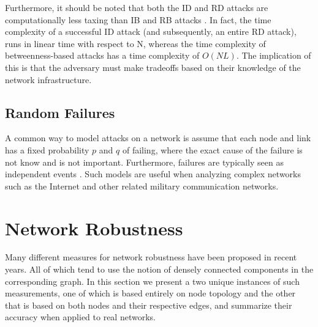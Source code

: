 \documentclass[11pt]{article}
\begin{document}
Furthermore, it should be noted that both the ID and RD attacks are computationally less taxing than IB and RB attacks \cite{Attacks}. In fact, the time complexity of a successful ID attack (and subsequently, an entire RD attack), runs in linear time with respect to N, whereas the time complexity of betweenness-based attacks has a time complexity of $O(NL)$. The implication of this is that the adversary must make tradeoffs based on their knowledge of the network infrastructure.

\subsection{Random Failures}
\label{RandomFailures}
A common way to model attacks on a network is assume that each node and link has a fixed probability $p$ and $q$ of failing, where the exact cause of the failure is not know and is not important. Furthermore, failures are typically seen as independent events \cite{RandomStudy}. Such models are useful when analyzing complex networks such as the Internet and other related military communication networks. 

\section{Network Robustness}

Many different measures for network robustness have been proposed in recent years. All of which tend
to use the notion of densely connected components in the corresponding graph. In this section we present
a two unique instances of such measurements, one of which is based entirely on node topology and the other that is based on both nodes and their respective edges, and summarize their accuracy when applied to real networks.
\end{document}
